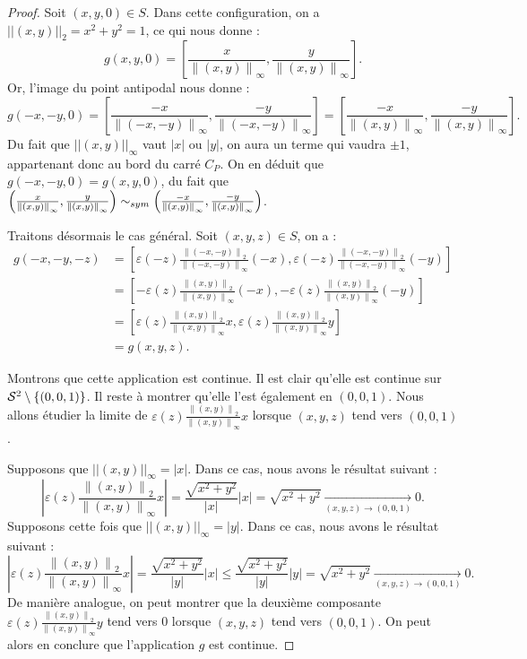 \documentclass[hidelinks, 10pt]{article}
\begin{document}
\begin{proof}
Soit $(x,y,0)\in S$. Dans cette configuration, on a $||(x,y)||_2=x^2+y^2=1$, ce qui nous donne : \[g(x,y,0)=\left[\frac{x}{\left \| (x,y) \right \|_\infty},\frac{y}{\left \| (x,y) \right \|_\infty}\right].\]Or, l'image du point antipodal nous donne : \[g(-x,-y,0)=\left[\frac{-x}{\left \| (-x,-y) \right \|_\infty},\frac{-y}{\left \| (-x,-y) \right \|_\infty}\right]=\left[\frac{-x}{\left \| (x,y) \right \|_\infty},\frac{-y}{\left \| (x,y) \right \|_\infty}\right].\] Du fait que $||(x,y)||_\infty$ vaut $|x|$ ou $|y|$, on aura un terme qui vaudra $\pm1$, appartenant donc au bord du carré $C_P$. On en déduit que $g(-x,-y,0)=g(x,y,0)$, du fait que $\left(\frac{x}{\left \| (x,y) \right \|_\infty},\frac{y}{\left \| (x,y) \right \|_\infty}\right)\sim_{sym}\left(\frac{-x}{\left \| (x,y) \right \|_\infty},\frac{-y}{\left \| (x,y) \right \|_\infty}\right)$.

Traitons désormais le cas général. Soit $(x,y,z)\in S$, on a :\[\begin{split}
g(-x,-y,-z)&=\left[\varepsilon(-z)\frac{\left \| (-x,-y) \right \|_2}{\left \| (-x,-y) \right \|_\infty}(-x),\varepsilon(-z)\frac{\left \| (-x,-y) \right \|_2}{\left \| (-x,-y) \right \|_\infty}(-y)\right]\\
&=\left[-\varepsilon(z)\frac{\left \| (x,y) \right \|_2}{\left \| (x,y) \right \|_\infty}(-x),-\varepsilon(z)\frac{\left \| (x,y) \right \|_2}{\left \| (x,y) \right \|_\infty}(-y)\right]\\
&=\left[\varepsilon(z)\frac{\left \| (x,y) \right \|_2}{\left \| (x,y) \right \|_\infty}x,\varepsilon(z)\frac{\left \| (x,y) \right \|_2}{\left \| (x,y) \right \|_\infty}y\right]\\
&=g(x,y,z).
\end{split}\]

Montrons que cette application est continue. Il est clair qu'elle est continue sur $\mathcal{S}^{2}\setminus\{(0,0,1)\}$. Il reste à montrer qu'elle l'est également en $(0,0,1)$. Nous allons étudier la limite de $\varepsilon(z)\frac{\left \| (x,y) \right \|_2}{\left \| (x,y) \right \|_\infty}x$ lorsque $(x,y,z)$ tend vers $(0,0,1)$.

Supposons que $||(x,y)||_\infty=|x|$. Dans ce cas, nous avons le résultat suivant : \[\left|\varepsilon(z)\frac{\left \| (x,y) \right \|_2}{\left \| (x,y) \right \|_\infty}x\right|=\frac{\sqrt{x^2+y^2}}{|x|}|x|=\sqrt{x^2+y^2}\underset{(x,y,z)\to(0,0,1)}{\longrightarrow}0.\]Supposons cette fois que $||(x,y)||_\infty=|y|$. Dans ce cas, nous avons le résultat suivant : \[\left|\varepsilon(z)\frac{\left \| (x,y) \right \|_2}{\left \| (x,y) \right \|_\infty}x\right|=\frac{\sqrt{x^2+y^2}}{|y|}|x|\leq\frac{\sqrt{x^2+y^2}}{|y|}|y|=\sqrt{x^2+y^2}\underset{(x,y,z)\to(0,0,1)}{\longrightarrow}0.\]De manière analogue, on peut montrer que la deuxième composante $\varepsilon(z)\frac{\left \| (x,y) \right \|_2}{\left \| (x,y) \right \|_\infty}y$ tend vers 0 lorsque $(x,y,z)$ tend vers $(0,0,1)$. On peut alors en conclure que l'application $g$ est continue.


\end{proof}
\end{document}
